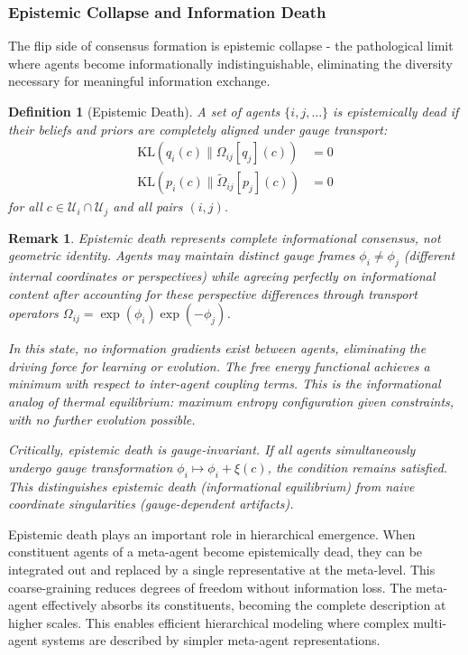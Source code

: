 \documentclass[11pt]{article}
\newtheorem{definition}{Definition}
\newtheorem{remark}{Remark}
\begin{document}
\subsubsection{Epistemic Collapse and Information Death}

The flip side of consensus formation is epistemic collapse - the pathological limit where agents become informationally indistinguishable, eliminating the diversity necessary for meaningful information exchange.

\begin{definition}[Epistemic Death]
A set of agents $\{i, j, \ldots\}$ is epistemically dead if their beliefs and priors are completely aligned under gauge transport:
\begin{align}
\mathrm{KL}(q_i(c) \| \Omega_{ij}[q_j](c)) &= 0 \\
\mathrm{KL}(p_i(c) \| \tilde{\Omega}_{ij}[p_j](c)) &= 0
\end{align}
for all $c \in \mathcal{U}_i \cap \mathcal{U}_j$ and all pairs $(i,j)$.
\end{definition}

\begin{remark}
Epistemic death represents complete informational consensus, not geometric identity. Agents may maintain distinct gauge frames $\phi_i \neq \phi_j$ (different internal coordinates or perspectives) while agreeing perfectly on informational content after accounting for these perspective differences through transport operators $\Omega_{ij} = \exp(\phi_i)\exp(-\phi_j)$. 

In this state, no information gradients exist between agents, eliminating the driving force for learning or evolution. The free energy functional achieves a minimum with respect to inter-agent coupling terms. This is the informational analog of thermal equilibrium: maximum entropy configuration given constraints, with no further evolution possible.

Critically, epistemic death is gauge-invariant. If all agents simultaneously undergo gauge transformation $\phi_i \mapsto \phi_i + \xi(c)$, the condition remains satisfied. This distinguishes epistemic death (informational equilibrium) from naive coordinate singularities (gauge-dependent artifacts).
\end{remark}


Epistemic death plays an important role in hierarchical emergence. When constituent agents of a meta-agent become epistemically dead, they can be integrated out and replaced by a single representative at the meta-level. This coarse-graining reduces degrees of freedom without information loss. The meta-agent effectively absorbs its constituents, becoming the complete description at higher scales. This enables efficient hierarchical modeling where complex multi-agent systems are described by simpler meta-agent representations.
\end{document}
